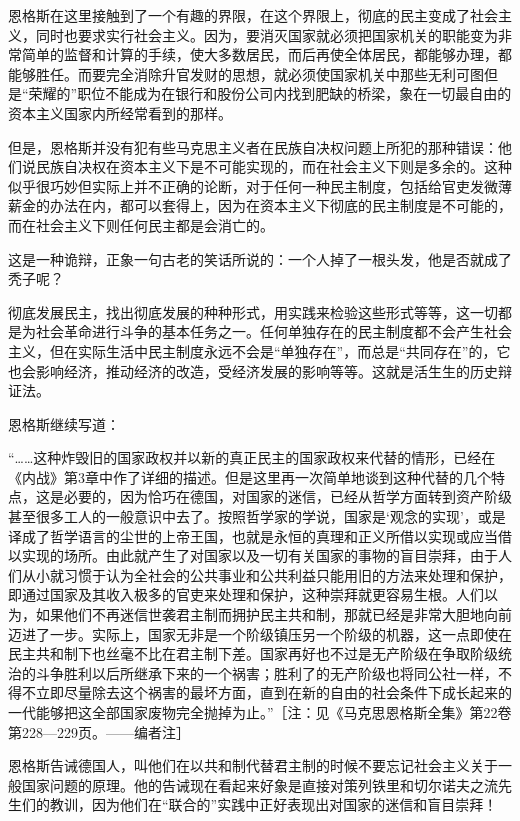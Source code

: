 \documentclass[UTF8, 12pt, a4paper]{ctexrep}
\begin{document}
恩格斯在这里接触到了一个有趣的界限，在这个界限上，彻底的民主变成了社会主义，同时也要求实行社会主义。因为，要消灭国家就必须把国家机关的职能变为非常简单的监督和计算的手续，使大多数居民，而后再使全体居民，都能够办理，都能够胜任。而要完全消除升官发财的思想，就必须使国家机关中那些无利可图但是“荣耀的”职位不能成为在银行和股份公司内找到肥缺的桥梁，象在一切最自由的资本主义国家内所经常看到的那样。

但是，恩格斯并没有犯有些马克思主义者在民族自决权问题上所犯的那种错误：他们说民族自决权在资本主义下是不可能实现的，而在社会主义下则是多余的。这种似乎很巧妙但实际上并不正确的论断，对于任何一种民主制度，包括给官吏发微薄薪金的办法在内，都可以套得上，因为在资本主义下彻底的民主制度是不可能的，而在社会主义下则任何民主都是会消亡的。

这是一种诡辩，正象一句古老的笑话所说的：一个人掉了一根头发，他是否就成了秃子呢？

彻底发展民主，找出彻底发展的种种形式，用实践来检验这些形式等等，这一切都是为社会革命进行斗争的基本任务之一。任何单独存在的民主制度都不会产生社会主义，但在实际生活中民主制度永远不会是“单独存在”，而总是“共同存在”的，它也会影响经济，推动经济的改造，受经济发展的影响等等。这就是活生生的历史辩证法。

恩格斯继续写道：

“……这种炸毁旧的国家政权并以新的真正民主的国家政权来代替的情形，已经在《内战》第3章中作了详细的描述。但是这里再一次简单地谈到这种代替的几个特点，这是必要的，因为恰巧在德国，对国家的迷信，已经从哲学方面转到资产阶级甚至很多工人的一般意识中去了。按照哲学家的学说，国家是‘观念的实现’，或是译成了哲学语言的尘世的上帝王国，也就是永恒的真理和正义所借以实现或应当借以实现的场所。由此就产生了对国家以及一切有关国家的事物的盲目崇拜，由于人们从小就习惯于认为全社会的公共事业和公共利益只能用旧的方法来处理和保护，即通过国家及其收入极多的官吏来处理和保护，这种崇拜就更容易生根。人们以为，如果他们不再迷信世袭君主制而拥护民主共和制，那就已经是非常大胆地向前迈进了一步。实际上，国家无非是一个阶级镇压另一个阶级的机器，这一点即使在民主共和制下也丝毫不比在君主制下差。国家再好也不过是无产阶级在争取阶级统治的斗争胜利以后所继承下来的一个祸害；胜利了的无产阶级也将同公社一样，不得不立即尽量除去这个祸害的最坏方面，直到在新的自由的社会条件下成长起来的一代能够把这全部国家废物完全抛掉为止。”［注：见《马克思恩格斯全集》第22卷第228—229页。——编者注］

恩格斯告诫德国人，叫他们在以共和制代替君主制的时候不要忘记社会主义关于一般国家问题的原理。他的告诫现在看起来好象是直接对策列铁里和切尔诺夫之流先生们的教训，因为他们在“联合的”实践中正好表现出对国家的迷信和盲目崇拜！
\end{document}

